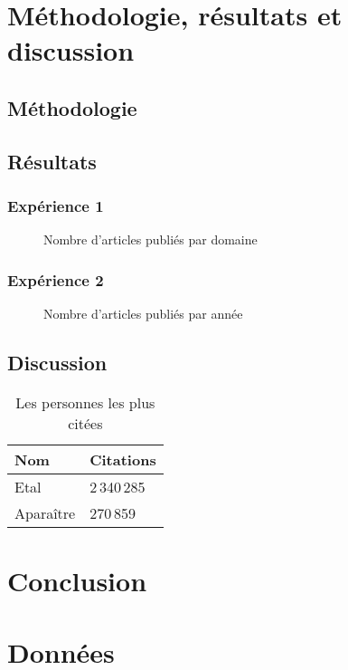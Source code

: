 \documentclass[phd]{dissertum}
\begin{document}
  \chapter{Méthodologie, résultats et discussion}
    \lipsum[1]
    \section{Méthodologie}
      \lipsum[2]
    \section{Résultats}
      \lipsum[3]
      \subsection{Expérience 1}
        \lipsum[4]
        \begin{figure}[tbh]
          \centering
          \caption{Nombre d'articles publiés par domaine}
        \end{figure}
      \subsection{Expérience 2}
        \lipsum[5]
        \begin{figure}[tbh]
          \centering
          \caption{Nombre d'articles publiés par année}
        \end{figure}
    \section{Discussion}
      \lipsum[6]
      \begin{table}[tbh]
        \centering
        \begin{tabular}{ll}
          \toprule
          \bf Nom & \bf Citations \\
          \midrule
          Etal & 2\,340\,285 \\
          Aparaître & 270\,859 \\ 
          \bottomrule
        \end{tabular}
        \caption{Les personnes les plus citées}
      \end{table}

  \chapter{Conclusion}
    \lipsum[7]

  
  
  
  
  \appendix
  \chapter{Données}
    \lipsum[8-10]
\end{document}
